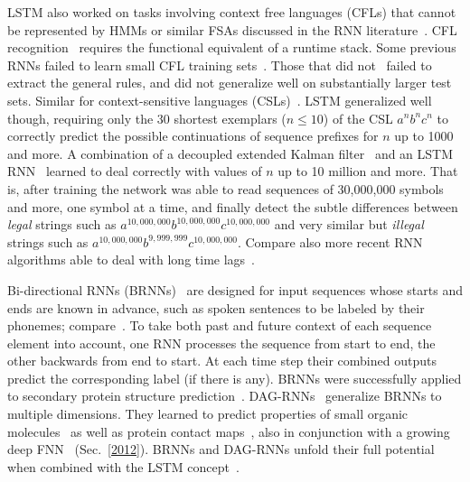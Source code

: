 \documentclass[letterpaper]{article}
\begin{document}
\begin{CJK*}{UTF8}{gbsn}
\begin{sloppypar}
LSTM also worked on tasks involving
context free languages (CFLs) that cannot be represented by HMMs or similar FSAs
discussed in the RNN literature~\citep{Sun93:abRNN,wiles95learning,andrews1995,steijvers96recurrent,tonkes97learning,Rodriguez:1999CS,Rodriguez+Wiles:1998:nips10}.
CFL recognition~\citep{lee-learning:96} requires the functional equivalent of a runtime stack.
Some previous RNNs failed to learn small
CFL training sets~\citep{Rodriguez+Wiles:1998:nips10}.
Those that did not~\citep{Rodriguez:1999CS,boden00context-free}
failed to extract the
general rules, and did not generalize
well on substantially larger test sets.
Similar for context-sensitive languages (CSLs)~\citep[e.g.,][]{ChalupBlairNN2003}.
LSTM generalized  well though,
requiring only the 30 shortest exemplars
($n \leq 10$) of the CSL $a^nb^nc^n$ to
correctly predict the possible continuations of sequence prefixes
for $n$ up to 1000 and more.
A combination of a decoupled extended Kalman filter~\citep{kalman1960,williams1992kalman,Puskorius:94,feldkamp1998kalman,haykin2001,feldkamp2003}
and an LSTM RNN~\citep{Perez:02}
learned to deal correctly with values of $n$ up to 10 million and more.
That is, after training the network was able to
read sequences of 30,000,000 symbols and more,
one symbol at a time, and
finally detect the subtle differences between
{\em legal} strings such as
$a^{10,000,000}b^{10,000,000}c^{10,000,000}$
and
very similar but {\em illegal} strings such as
$a^{10,000,000}b^{9,999,999}c^{10,000,000}$.
Compare also more recent RNN algorithms able to deal with long
time lags~\citep{DBLP:conf/icann/SchaferUZ06,Martens:2011hessfree,DBLP:series/lncs/ZimmermannTG12,icml2014}.



Bi-directional RNNs (BRNNs)~\citep{schuster97bidirectional,schuster99thesis} are designed for input sequences whose
starts and ends are known in advance, such as spoken sentences to be labeled by their phonemes; compare~\citep{fukada99boundary}. 
To take both past and future context of each sequence element into account,
one RNN processes the sequence from start to end, 
the other backwards from end to start. 
At each time step their combined outputs predict the corresponding label (if there is any).
BRNNs were successfully applied to secondary protein structure 
prediction~\citep{baldi99exploiting}.
DAG-RNNs~\citep{baldi2003jmlr,wu2008go} generalize BRNNs to multiple dimensions.
 They
learned to predict properties of small organic molecules~\citep{lusci2013}
as well as
protein contact maps~\citep{tegge2009},
also in conjunction with a growing deep FNN~\citep{baldi2012contact} (Sec.~\ref{2012}).
BRNNs and DAG-RNNs unfold their full potential when
combined with the LSTM concept~\citep{graves05nn,graves:2009nips,Graves:09tpami}.



\end{sloppypar}
\end{CJK*}
\end{document}
